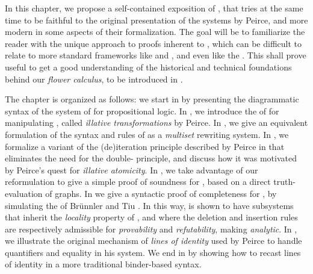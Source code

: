 In this chapter, we propose a self-contained exposition of , that tries
at the same time to be faithful to the original presentation of the systems by
Peirce, and more modern in some aspects of their formalization. The goal will be
to familiarize the reader with the unique approach to proofs inherent to
, which can be difficult to relate to more standard frameworks like
 and  , and
even   like the .
This shall prove useful to get a good understanding of the historical and
technical foundations behind our \emph{flower calculus}, to be introduced in
.

The chapter is organized as follows: we start in  by presenting
the diagrammatic syntax of the system  of  for 
propositional logic. In , we introduce the  of
 for manipulating , called \emph{illative
transformations} by Peirce. In , we give an equivalent
formulation of the syntax and rules of  as a \emph{multiset} rewriting
system. In , we formalize a variant of the (de)iteration
principle described by Peirce in  that
eliminates the need for the double- principle, and discuss how it was
motivated by Peirce's quest for \emph{illative atomicity}. In
, we take advantage of our reformulation to give a simple
proof of soundness for , based on a direct truth-evaluation of graphs.
In  we give a syntactic proof of completeness for
, by simulating the   of Brünnler and
Tiu . In this way,  is shown to have
subsystems that inherit the \emph{locality} property of , and where the
deletion and insertion rules are respectively admissible for \emph{provability}
and \emph{refutability}, making  \emph{analytic}. In , we
illustrate the original mechanism of \emph{lines of identity} used by Peirce to
handle quantifiers and equality in his  system. We end in
 by showing how to recast lines of identity in a more
traditional binder-based syntax.



